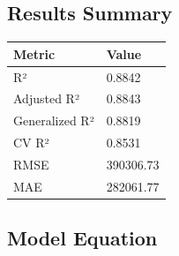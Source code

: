 \documentclass[
]{article}
\begin{document}
\subsection{Results Summary}\label{results-summary}

{\def\LTcaptype{} %
\begin{longtable}[]{@{}ll@{}}
\toprule\noalign{}
Metric & Value \\
\midrule\noalign{}
\endhead
\bottomrule\noalign{}
\endlastfoot
R² & 0.8842 \\
Adjusted R² & 0.8843 \\
Generalized R² & 0.8819 \\
CV R² & 0.8531 \\
RMSE & 390306.73 \\
MAE & 282061.77 \\
\end{longtable}
}

\subsection{Model Equation}\label{model-equation}
\end{document}
